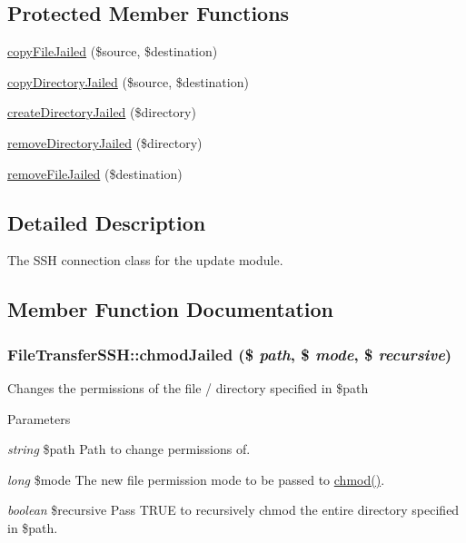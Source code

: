 \subsection*{Protected Member Functions}
\begin{DoxyCompactItemize}
\item 
\hyperlink{classFileTransferSSH_a300ba5b38e15b2411d927e95ae1c9258}{copyFileJailed} (\$source, \$destination)
\item 
\hyperlink{classFileTransferSSH_abf0f85befe3b628d7cc6543b23fed228}{copyDirectoryJailed} (\$source, \$destination)
\item 
\hyperlink{classFileTransferSSH_a4a36f6ce422bebc58aca5fe3b8a00d06}{createDirectoryJailed} (\$directory)
\item 
\hyperlink{classFileTransferSSH_a9b476fade233e689a0422593c961c0bb}{removeDirectoryJailed} (\$directory)
\item 
\hyperlink{classFileTransferSSH_aac364593d01d77780e3b22d76c778872}{removeFileJailed} (\$destination)
\end{DoxyCompactItemize}


\subsection{Detailed Description}
The SSH connection class for the update module. 

\subsection{Member Function Documentation}
\hypertarget{classFileTransferSSH_adb2f9be936419a0f28593552d1856c24}{
\subsubsection[{chmodJailed}]{\setlength{\rightskip}{0pt plus 5cm}FileTransferSSH::chmodJailed (\$ {\em path}, \/  \$ {\em mode}, \/  \$ {\em recursive})}}
\label{classFileTransferSSH_adb2f9be936419a0f28593552d1856c24}
Changes the permissions of the file / directory specified in \$path


\begin{DoxyParams}{Parameters}
\item[{\em string}]\$path Path to change permissions of. \item[{\em long}]\$mode The new file permission mode to be passed to \hyperlink{classFileTransfer_a7c49554b3cce3ab7cc03e2f45f9934b1}{chmod()}. \item[{\em boolean}]\$recursive Pass TRUE to recursively chmod the entire directory specified in \$path. \end{DoxyParams}


